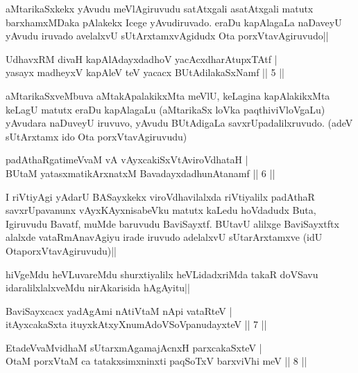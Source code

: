 \begin{artha}
aMtarikaSxkekx yAvudu meVlAgiruvudu satAtxgali asatAtxgali matutx barxhamxMDaka pAlakekx Icege yAvudiruvado. eraDu kapAlagaLa naDaveyU yAvudu iruvado avelalxvU sUtArxtamxvAgidudx Ota porxVtavAgiruvudo||
\end{artha}


\begin{shl}
UdhavxRM divaH kapAlAdayxdadhoV yacAcxdharAtupxTAtf |\\
yasayx madheyxV kapAleV teV yacacx BUtAdilakaSxNamf \hfill || 5 ||
\end{shl}

\begin{artha}
aMtarikaSxveMbuva aMtakApalakikxMta meVlU, keLagina kapAlakikxMta keLagU matutx eraDu kapAlagaLu (aMtarikaSx loVka paqthiviVloVgaLu) yAvudara naDuveyU iruvuvo, yAvudu BUtAdigaLa savxrUpadalilxruvudo. (adeV sUtArxtamx ido Ota porxVtavAgiruvudu)
\end{artha}

\begin{shl}
padAthaRgatimeVvaM vA vAyxcakiSxVtAviroVdhataH |\\
BUtaM yatasxmatikArxnatxM BavadayxdadhunAtanamf \hfill || 6 ||
\end{shl}

\begin{artha}
I riVtiyAgi yAdarU BASayxkekx viroVdhavilalxda riVtiyalilx padAthaR savxrUpavanunx vAyxKAyxnisabeVku matutx kaLedu hoVdadudx Buta, Igiruvudu Bavatf, muMde baruvudu BaviSayxtf. BUtavU alilxge BaviSayxtftx alalxde vataRmAnavAgiyu irade iruvudo adelalxvU sUtarArxtamxve (idU OtaporxVtavAgiruvudu)||

hiVgeMdu heVLuvareMdu shurxtiyalilx heVLidadxriMda takaR doVSavu idaralilxlalxveMdu nirAkarisida hAgAyitu||
\end{artha}%

\begin{shl}
BaviSayxcacx yadAgAmi nAtiVtaM nApi vataRteV |\\
itAyxcakaSxta ituyxkAtxyX\s numAdoVSoV\s panudayxteV \hfill || 7 ||
\end{shl}

\begin{shl}
EtadeVvaMvidhaM sUtarxmAgamajAcnxH parxcakaSxteV |\\
OtaM porxVtaM ca tatakxsimxninxti paqSoTxV barxviVhi meV \hfill || 8 ||
\end{shl}


